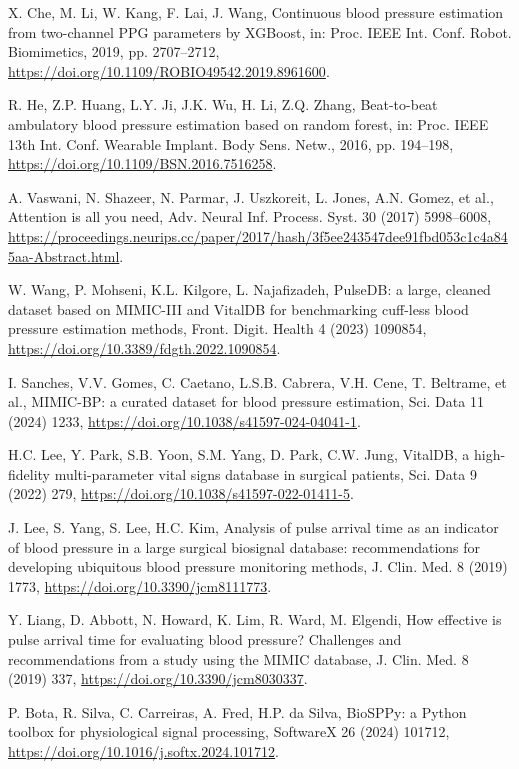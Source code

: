 \documentclass[preprint,12pt]{elsarticle}
\begin{document}
\begin{enumerate}[label={[\arabic*]},leftmargin=2.2em]
\item X. Che, M. Li, W. Kang, F. Lai, J. Wang, Continuous blood pressure estimation from two-channel PPG parameters by XGBoost, in: Proc. IEEE Int. Conf. Robot. Biomimetics, 2019, pp. 2707--2712, \url{https://doi.org/10.1109/ROBIO49542.2019.8961600}.
\item R. He, Z.P. Huang, L.Y. Ji, J.K. Wu, H. Li, Z.Q. Zhang, Beat-to-beat ambulatory blood pressure estimation based on random forest, in: Proc. IEEE 13th Int. Conf. Wearable Implant. Body Sens. Netw., 2016, pp. 194--198, \url{https://doi.org/10.1109/BSN.2016.7516258}.
\item A. Vaswani, N. Shazeer, N. Parmar, J. Uszkoreit, L. Jones, A.N. Gomez, et al., Attention is all you need, Adv. Neural Inf. Process. Syst. 30 (2017) 5998--6008, \url{https://proceedings.neurips.cc/paper/2017/hash/3f5ee243547dee91fbd053c1c4a845aa-Abstract.html}.
\item W. Wang, P. Mohseni, K.L. Kilgore, L. Najafizadeh, PulseDB: a large, cleaned dataset based on MIMIC-III and VitalDB for benchmarking cuff-less blood pressure estimation methods, Front. Digit. Health 4 (2023) 1090854, \url{https://doi.org/10.3389/fdgth.2022.1090854}.
\item I. Sanches, V.V. Gomes, C. Caetano, L.S.B. Cabrera, V.H. Cene, T. Beltrame, et al., MIMIC-BP: a curated dataset for blood pressure estimation, Sci. Data 11 (2024) 1233, \url{https://doi.org/10.1038/s41597-024-04041-1}.
\item H.C. Lee, Y. Park, S.B. Yoon, S.M. Yang, D. Park, C.W. Jung, VitalDB, a high-fidelity multi-parameter vital signs database in surgical patients, Sci. Data 9 (2022) 279, \url{https://doi.org/10.1038/s41597-022-01411-5}.
\item J. Lee, S. Yang, S. Lee, H.C. Kim, Analysis of pulse arrival time as an indicator of blood pressure in a large surgical biosignal database: recommendations for developing ubiquitous blood pressure monitoring methods, J. Clin. Med. 8 (2019) 1773, \url{https://doi.org/10.3390/jcm8111773}.
\item Y. Liang, D. Abbott, N. Howard, K. Lim, R. Ward, M. Elgendi, How effective is pulse arrival time for evaluating blood pressure? Challenges and recommendations from a study using the MIMIC database, J. Clin. Med. 8 (2019) 337, \url{https://doi.org/10.3390/jcm8030337}.
\item P. Bota, R. Silva, C. Carreiras, A. Fred, H.P. da Silva, BioSPPy: a Python toolbox for physiological signal processing, SoftwareX 26 (2024) 101712, \url{https://doi.org/10.1016/j.softx.2024.101712}.

\end{enumerate}
\end{document}

